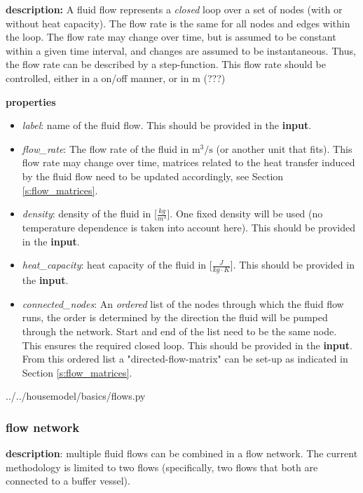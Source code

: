 \textbf{description:} A fluid flow represents a \emph{closed} loop over a set of nodes (with or without heat capacity). The flow rate is the same for all nodes and edges within the loop. The flow rate may change over time, but is assumed to be constant within a given time interval, and changes are assumed to be instantaneous. Thus, the flow rate can be described by a step-function. This flow rate should be controlled, either in a on/off manner, or in m (???)

\textbf{properties}
\begin{itemize}
	\item \emph{label}: name of the fluid flow. This should be provided in the \textbf{input}.
	\item \emph{flow\_rate}: The flow rate of the fluid in $\text{m}^3/\text{s}$ (or another unit that fits). This flow rate may change over time, matrices related to the heat transfer induced by the fluid flow need to be updated accordingly, see Section \ref{s:flow_matrices}. 
	\item \emph{density}: density of the fluid in [$\frac{kg}{m^3}$]. One fixed density will be used (no temperature dependence is taken into account here). This should be provided in the \textbf{input}.
	\item \emph{heat\_capacity}: heat capacity of the fluid in [$\frac{J}{kg \cdot K}$]. This should be provided in the \textbf{input}.
	\item \emph{connected\_nodes}: An \emph{ordered} list of the nodes through which the fluid flow runs, the order is determined by the direction the fluid will be pumped through the network. Start and end of the list need to be the same node. This ensures the required closed loop. This should be provided in the \textbf{input}. From this ordered list a "directed-flow-matrix" can be set-up as indicated in Section \ref{s:flow_matrices}. 
\end{itemize}

 
{../../housemodel/basics/flows.py}

\subsubsection{flow network}
\textbf{description}: multiple fluid flows can be combined in a flow network. The current  methodology is limited to two flows (specifically, two flows that both are connected to a buffer vessel). 

